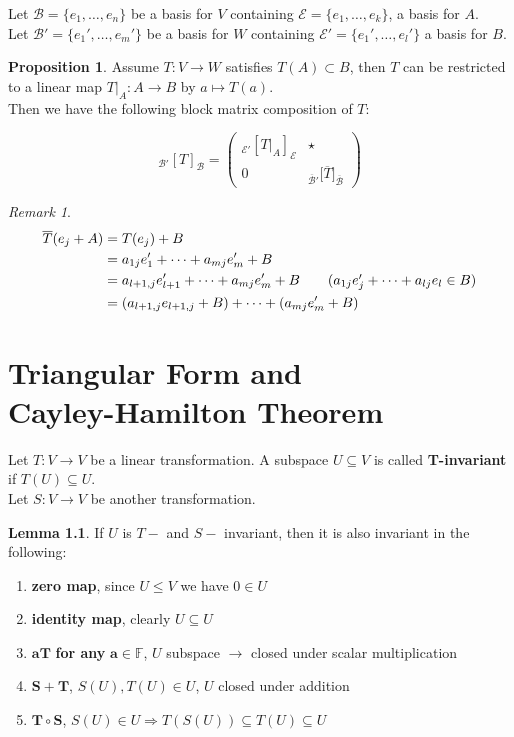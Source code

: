 \documentclass[11pt, a4paper]{report}
\numberwithin{equation}{section}
\newcommand{\F}{\mathbb{F}}
\newcommand{\pmx}[1]{\begin{pmatrix}#1\end{pmatrix}}
\numberwithin{equation}{subsection}
\theoremstyle{plain}
\theoremstyle{definition}
\newtheorem{lem}[thm]{Lemma}
\newtheorem{prop}[thm]{Proposition}
\theoremstyle{remark}
\newtheorem*{rem}{Remark}
\begin{document}
Let $\mathcal{B} = \{ e_1, \ldots, e_n \}$ be a basis for $V$ containing $\mathcal{E} = \{ e_1, \ldots, e_k \}$, a basis for $A$.\\
Let $\mathcal{B'} = \{ e_1', \ldots, e_m' \}$ be a basis for $W$ containing $\mathcal{E'} = \{ e_1', \ldots, e_l' \}$ a basis for $B$.\\

\begin{prop} Assume $T: V \to W$ satisfies $T(A) \subset B$, then $T$ can be restricted to a linear map $T|_A : A \to B$ by $a \mapsto T(a)$.\\
Then we have the following block matrix composition of $T$:

$$_\mathcal{B'}[T]_\mathcal{B} = \pmx{_\mathcal{E'}[T|_A]_\mathcal{E} & \star \\ 0 & _{\overline{\mathcal{B}}'}\big[\overline{T}\big]_{\overline{\mathcal{B}}}}$$

\begin{rem} 
\begin{align*}
\overline{T} (e_j + A) 	&= T(e_j) + B\\
							&= a_{1j}e_1' + \cdots + a_{mj}e_m' + B\\
							&= a_{l+1,j}e_{l+1}' + \cdots + a_{mj}e_m' + B \tag{$a_{1j}e_j' + \cdots + a_{lj}e_l \in B$}\\
							&= (a_{l+1,j}e_{l+1,j} + B) + \cdots + (a_{mj}e_m' + B)
\end{align*}
\end{rem}
\end{prop}

\chapter[Triangular Form and Cayley-Hamilton Theorem]{Triangular Form and\\ Cayley-Hamilton Theorem}
Let $T: V \to V$ be a linear transformation. A subspace $U \subseteq V$ is called \textbf{T-invariant} if $T(U) \subseteq U$.\\
Let $S: V \to V$ be another transformation.

\begin{lem} If $U$ is $T-$ and $S-$ invariant, then it is also invariant in the following:
\begin{enumerate}[(1) ]
\item \textbf{zero map}, since $U \leq V$ we have $0 \in U$
\item \textbf{identity map}, clearly $U \subseteq U$
\item $\boldsymbol{aT}$ \textbf{for any} $\boldsymbol{a \in \F}$, $U$ subspace $\rightarrow$ closed under scalar multiplication
\item $\boldsymbol{S + T}$, $S(U), T(U) \in U$, $U$ closed under addition
\item $\boldsymbol{T \circ S}$, $S(U) \in U \Rightarrow T(S(U)) \subseteq T(U) \subseteq U$
\end{enumerate} \end{lem}
\end{document}
